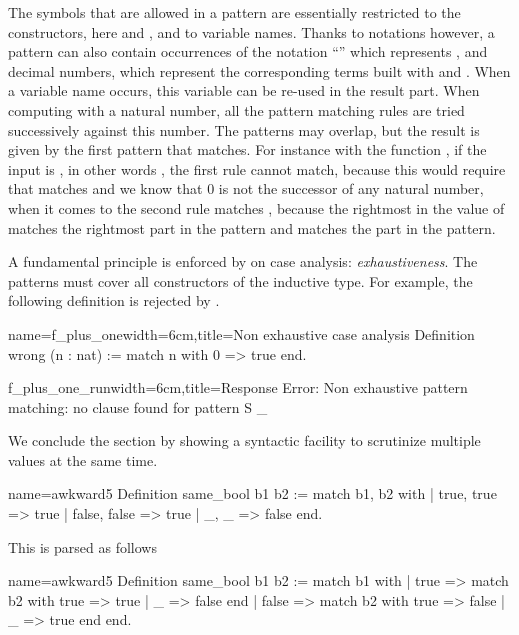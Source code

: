 The symbols that are allowed in a pattern are essentially restricted
to the constructors, here  and , and to variable names.
Thanks to notations however, a pattern can also contain
occurrences of the notation ``'' which represents , and
decimal numbers, which represent the corresponding terms built with
 and .  When a variable name occurs, this variable can be
re-used in the result part.  When computing with a natural number, all
the pattern matching rules are tried successively against this number.  The
patterns may overlap, but the result is given by the first pattern that
matches.
For instance with the function , if the input is , in other words , the first
rule cannot match, because this would require that  matches
 and we know that \(0\) is not the successor of any
natural number, when it comes to the second rule  matches
, because the rightmost  in the value of  matches
the rightmost  part in the pattern and  matches the  part
in the pattern.

A fundamental principle is enforced by \Coq{} on case analysis:
\emph{exhaustiveness}.  The patterns must cover all constructors of
the inductive type.  For example, the following definition is
rejected by \Coq{}.

\begin{coq}{name=f_plus_one}{width=6cm,title=Non exhaustive case analysis}
Definition wrong (n : nat) :=
  match n with 0 => true end.
$~$
\end{coq}
\begin{coqout}{f_plus_one_run}{width=6cm,title=Response}
Error: Non exhaustive pattern
matching: no clause found for
pattern S _
\end{coqout}

We conclude the section by showing a syntactic facility to scrutinize
multiple values at the same time.

\begin{coq}{name=awkward5}{}
Definition same_bool b1 b2 :=
  match b1, b2 with
  | true, true => true
  | false, false => true
  | _, _ => false
  end.
\end{coq}

This is parsed as follows

\begin{coq}{name=awkward5}{}
Definition same_bool b1 b2 :=
  match b1 with
  | true => match b2 with true => true | _ => false end
  | false => match b2 with true => false | _ => true end
  end.
\end{coq}

